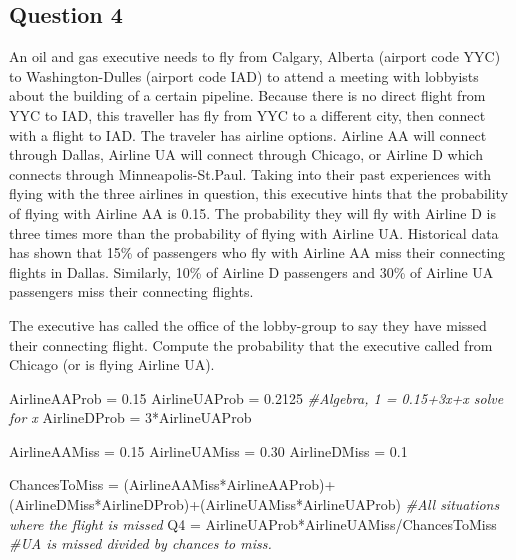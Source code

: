 \documentclass[
]{article}
\newenvironment{Shaded}{\begin{snugshade}}{\end{snugshade}}
\newcommand{\CommentTok}[1]{\textcolor[rgb]{0.56,0.35,0.01}{\textit{#1}}}
\newcommand{\DecValTok}[1]{\textcolor[rgb]{0.00,0.00,0.81}{#1}}
\newcommand{\FloatTok}[1]{\textcolor[rgb]{0.00,0.00,0.81}{#1}}
\newcommand{\NormalTok}[1]{#1}
\newcommand{\OtherTok}[1]{\textcolor[rgb]{0.56,0.35,0.01}{#1}}
\newcommand{\SpecialCharTok}[1]{\textcolor[rgb]{0.00,0.00,0.00}{#1}}
\begin{document}
\hypertarget{question-4}{%
\subsection{Question 4}\label{question-4}}

An oil and gas executive needs to fly from Calgary, Alberta (airport
code YYC) to Washington-Dulles (airport code IAD) to attend a meeting
with lobbyists about the building of a certain pipeline. Because there
is no direct flight from YYC to IAD, this traveller has fly from YYC to
a different city, then connect with a flight to IAD. The traveler has
airline options. Airline AA will connect through Dallas, Airline UA will
connect through Chicago, or Airline D which connects through
Minneapolis-St.Paul. Taking into their past experiences with flying with
the three airlines in question, this executive hints that the
probability of flying with Airline AA is 0.15. The probability they will
fly with Airline D is three times more than the probability of flying
with Airline UA. Historical data has shown that 15\% of passengers who
fly with Airline AA miss their connecting flights in Dallas. Similarly,
10\% of Airline D passengers and 30\% of Airline UA passengers miss
their connecting flights.

The executive has called the office of the lobby-group to say they have
missed their connecting flight. Compute the probability that the
executive called from Chicago (or is flying Airline UA).

\begin{Shaded}
\begin{Highlighting}[]
\NormalTok{AirlineAAProb }\OtherTok{=} \FloatTok{0.15}
\NormalTok{AirlineUAProb }\OtherTok{=} \FloatTok{0.2125} \CommentTok{\#Algebra, 1 = 0.15+3x+x solve for x}
\NormalTok{AirlineDProb }\OtherTok{=} \DecValTok{3}\SpecialCharTok{*}\NormalTok{AirlineUAProb}

\NormalTok{AirlineAAMiss }\OtherTok{=} \FloatTok{0.15}
\NormalTok{AirlineUAMiss }\OtherTok{=} \FloatTok{0.30}
\NormalTok{AirlineDMiss }\OtherTok{=} \FloatTok{0.1}

\NormalTok{ChancesToMiss }\OtherTok{=}\NormalTok{ (AirlineAAMiss}\SpecialCharTok{*}\NormalTok{AirlineAAProb)}\SpecialCharTok{+}\NormalTok{(AirlineDMiss}\SpecialCharTok{*}\NormalTok{AirlineDProb)}\SpecialCharTok{+}\NormalTok{(AirlineUAMiss}\SpecialCharTok{*}\NormalTok{AirlineUAProb) }\CommentTok{\#All situations where the flight is missed}
\NormalTok{Q4 }\OtherTok{=}\NormalTok{ AirlineUAProb}\SpecialCharTok{*}\NormalTok{AirlineUAMiss}\SpecialCharTok{/}\NormalTok{ChancesToMiss }\CommentTok{\#UA is missed divided by chances to miss. }
\end{Highlighting}
\end{Shaded}
\end{document}
